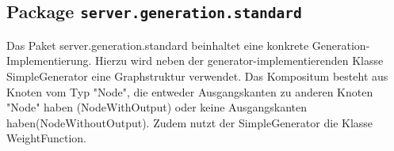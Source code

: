 \FloatBarrier
\subsection[Package server.generation.standard]{Package \texttt{server.generation.standard}}
Das Paket server.generation.standard beinhaltet eine konkrete Generation-Implementierung. 
Hierzu wird neben der generator-implementierenden Klasse SimpleGenerator eine Graphstruktur verwendet.
Das Kompositum besteht aus Knoten vom Typ "Node", die entweder Ausgangskanten zu anderen Knoten "Node" haben (NodeWithOutput)
oder keine Ausgangskanten haben(NodeWithoutOutput). Zudem nutzt der SimpleGenerator die Klasse WeightFunction.

       